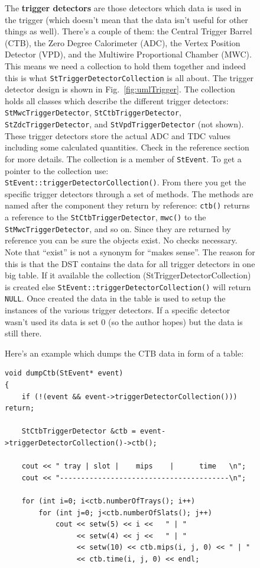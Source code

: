 \documentclass[twoside]{article}
\begin{document}
\begin{figure}[htb]
\begin{center}
The \textbf{trigger detectors} are those detectors which data is used
in the trigger (which doesn't mean that the data isn't useful for
other things as well). There's a couple of them: the Central Trigger
Barrel (CTB), the Zero Degree Calorimeter (ADC), the Vertex Position
Detector (VPD), and the Multiwire Proportional Chamber (MWC). This
means we need a collection to hold them together and indeed this is
what \texttt{StTriggerDetectorCollection} is all about. The trigger
detector design is shown in Fig.~\ref{fig:umlTrigger}.  The collection
holds all classes which describe the different trigger detectors:
\texttt{StMwcTriggerDetector}, \texttt{StCtbTriggerDetector},
\texttt{StZdcTriggerDetector}, and \texttt{StVpdTriggerDetector} (not
shown).  These trigger detectors store the actual ADC and TDC values
including some calculated quantities. Check in the reference section
for more details.  The collection is a member of \texttt{StEvent}. To
get a pointer to the collection use:
\texttt{StEvent::triggerDetectorCollection()}. From there you get the
specific trigger detectors through a set of methods.  The methods are
named after the component they return by reference: \texttt{ctb()}
returns a reference to the \texttt{StCtbTriggerDetector},
\texttt{mwc()} to the \texttt{StMwcTriggerDetector}, and so on.  Since
they are returned by reference you can be sure the objects exist. No
checks necessary. Note that ``exist'' is not a synonym for ``makes
sense''. The reason for this is that the DST contains the data for all
trigger detectors in one big table. If it available the collection
(StTriggerDetectorCollection) is created else
\texttt{StEvent::triggerDetectorCollection()} will return
\texttt{NULL}.  Once created the data in the table is used to setup
the instances of the various trigger detectors. If a specific detector
wasn't used its data is set 0 (so the author hopes) but the data is
still there.

Here's an example which dumps the CTB data in form of a table:
\begin{verbatim}
void dumpCtb(StEvent* event)
{
    if (!(event && event->triggerDetectorCollection())) return;

    StCtbTriggerDetector &ctb = event->triggerDetectorCollection()->ctb();

    cout << " tray | slot |    mips    |      time   \n";
    cout << "----------------------------------------\n";

    for (int i=0; i<ctb.numberOfTrays(); i++) 
        for (int j=0; j<ctb.numberOfSlats(); j++) 
            cout << setw(5) << i <<   " | "
                 << setw(4) << j <<   " | "
                 << setw(10) << ctb.mips(i, j, 0) << " | "
                 << ctb.time(i, j, 0) << endl;



\end{verbatim}
\end{center}
\end{figure}
\end{document}

